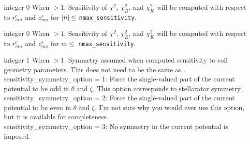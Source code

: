 \myhrule

{integer}
{0}
{When  $> 1$.}
{Sensitivity of $\chi^2$, $\chi^2_B$, and $\chi^2_K$ will be computed with respect to $r_{mn}^c$ and $z_{mn}^s$ for $\abs{n} \leq $ \texttt{nmax\_sensitivity}.}

\myhrule

{integer}
{0}
{When  $> 1$.}
{Sensitivity of $\chi^2$, $\chi^2_B$, and $\chi^2_K$ will be computed with respect to $r_{mn}^c$ and $z_{mn}^s$ for $m \leq $ \texttt{nmax\_sensitivity}.}

\myhrule

{integer}
{1}
{When  $> 1$.}
{Symmetry assumed when computed sensitivity to coil geometry parameters. This does not need to be the same as . \\
{\ttfamily sensitivity\_symmetry\_option} = 1: Force the single-valued part of the current potential
to be odd in $\theta$ and $\zeta$. This option corresponds to stellarator symmetry.\\

{\ttfamily sensitivity\_symmetry\_option} = 2: Force the single-valued part of the current potential
to be even in $\theta$ and $\zeta$. I'm not sure why you would ever use this option,
but it is available for completeness.\\

{\ttfamily sensitivity\_symmetry\_option} = 3: No symmetry in the current potential is imposed.
}

